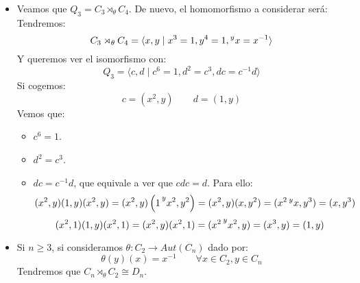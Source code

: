 \begin{ejemplo}
\begin{itemize}
        \item Veamos que $Q_3 = C_3\rtimes_\theta C_4$. De nuevo, el homomorfismo a considerar será:
            Tendremos:
            \begin{equation*}
                C_3\rtimes_\theta C_4 = \langle x,y\mid x^3=1, y^4 = 1, \prescript{y}{}{x}= x^{-1} \rangle 
            \end{equation*}
            Y queremos ver el isomorfismo con:
            \begin{equation*}
                Q_3 = \langle c,d\mid c^6=1, d^2 = c^3, dc=c^{-1}d \rangle 
            \end{equation*}
            Si cogemos:
            \begin{equation*}
                c = (x^2,y) \qquad d = (1,y)
            \end{equation*}
            Vemos que:
            \begin{itemize}
                \item $c^6 = 1$.
                \item $d^2 = c^3$.
                \item $dc = c^{-1}d$, que equivale a ver que $cdc = d$. Para ello:
                    \begin{equation*}
                        (x^2,y)(1,y)(x^2,y) = (x^2,y)\left(1\prescript{y}{}{x^2}, y^2\right) = (x^2,y)(x,y^2) = (x^2\prescript{y}{}{x},y^3) = (x,y^3)
                    \end{equation*}
                    \begin{equation*}
                        (x^2,1)(1,y)(x^2,1) = (x^2,y)(x^2,1) = (x^2\prescript{y}{}{x^2}, y) = (x^3,y) = (1,y)
                    \end{equation*}
            \end{itemize}
        \item Si $n\geq 3$, si consideramos $\theta:C_2\to Aut(C_n)$ dado por:
            \begin{equation*}
                \theta(y)(x) = x^{-1} \qquad \forall x\in C_2, y\in C_n
            \end{equation*}
            Tendremos que $C_n\rtimes_\theta C_2 \cong D_n$.
    \end{itemize}
\end{ejemplo}


